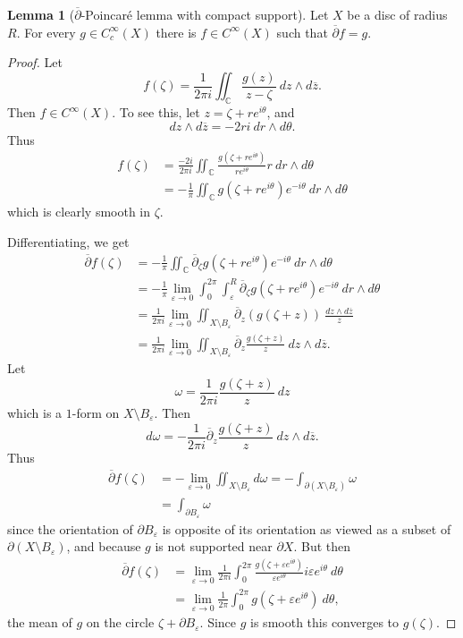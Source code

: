 \documentclass[12pt]{book}
\newcommand{\CC}{\mathbb{C}}
\newcommand{\dbar}{\overline\partial}
\theoremstyle{definition}
\newtheorem{lemma}[theorem]{Lemma}
\begin{document}
\begin{lemma}[$\dbar$-Poincar\'e lemma with compact support]
Let $X$ be a disc of radius $R$. For every $g \in C^\infty_c(X)$ there is $f \in C^\infty(X)$ such that $\dbar f = g$.
\end{lemma}
\begin{proof}
Let
$$f(\zeta) = \frac{1}{2\pi i} \iint_\CC \frac{g(z)}{z - \zeta} ~dz \wedge d\overline z.$$
Then $f \in C^\infty(X)$. To see this, let $z = \zeta + re^{i\theta}$, and
$$dz \wedge d\overline z = -2ri ~dr \wedge d\theta.$$
Thus
\begin{align*}
f(\zeta) &= \frac{-2i}{2\pi i} \iint_\CC \frac{g(\zeta + re^{i\theta})}{re^{i\theta}}r ~dr \wedge d\theta \\
&= -\frac{1}{\pi} \iint_\CC g(\zeta + re^{i\theta}) e^{-i\theta} ~dr \wedge d\theta
\end{align*}
which is clearly smooth in $\zeta$.

Differentiating, we get
\begin{align*}
\dbar f(\zeta) &= -\frac{1}{\pi} \iint_\CC \dbar_\zeta g(\zeta + re^{i\theta}) e^{-i\theta} ~dr \wedge d\theta\\
&= -\frac{1}{\pi} \lim_{\varepsilon \to 0} \int_0^{2\pi} \int_\varepsilon^R \dbar_\zeta g(\zeta + re^{i\theta}) e^{-i\theta} ~dr \wedge d\theta\\
&= \frac{1}{2\pi i} \lim_{\varepsilon \to 0} \iint_{X \setminus B_\varepsilon} \dbar_z(g(\zeta + z)) ~\frac{dz \wedge d\overline z}{z} \\
&= \frac{1}{2\pi i} \lim_{\varepsilon \to 0} \iint_{X \setminus B_\varepsilon} \dbar_z\frac{g(\zeta + z)}{z} ~dz \wedge d\overline z.
\end{align*}
Let
$$\omega = \frac{1}{2\pi i} \frac{g(\zeta + z)}{z} ~dz$$
which is a $1$-form on $X \setminus B_\varepsilon$.
Then
$$d\omega = -\frac{1}{2\pi i} \dbar_z\frac{g(\zeta + z)}{z} ~dz \wedge d\overline z.$$
Thus
\begin{align*}
\dbar f(\zeta) &= -\lim_{\varepsilon \to 0} \iint_{X \setminus B_\varepsilon} d\omega = -\int_{\partial(X \setminus B_\varepsilon)} \omega\\
&= \int_{\partial B_\varepsilon} \omega
\end{align*}
since the orientation of $\partial B_\varepsilon$ is opposite of its orientation as viewed as a subset of $\partial(X \setminus B_\varepsilon)$, and because $g$ is not supported near $\partial X$.
But then
\begin{align*}
\dbar f(\zeta) &= \lim_{\varepsilon \to 0} \frac{1}{2\pi i} \int_0^{2\pi} \frac{g(\zeta + \varepsilon e^{i\theta})}{\varepsilon e^{i\theta}} i\varepsilon e^{i\theta} ~d\theta \\
&= \lim_{\varepsilon \to 0} \frac{1}{2\pi} \int_0^{2\pi} g(\zeta + \varepsilon e^{i\theta}) ~d\theta,
\end{align*}
the mean of $g$ on the circle $\zeta + \partial B_\varepsilon$. Since $g$ is smooth this converges to $g(\zeta)$.
\end{proof}
\end{document}
